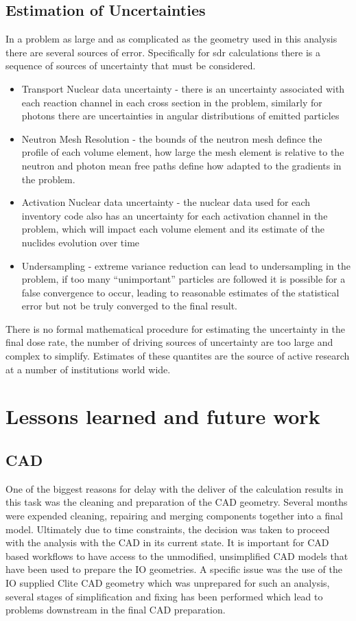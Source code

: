\documentclass[12pt]{article}
\begin{document}
\subsection{Estimation of Uncertainties}
In a problem as large and as complicated as the geometry used in this analysis
there are several sources of error. Specifically for \gls{sdr} calculations 
there is a sequence of sources of uncertainty that must be considered.
\begin{itemize} 
\item{Transport Nuclear data uncertainty - there is an uncertainty associated with each 
      reaction channel in each cross section in the problem, similarly for photons there are 
      uncertainties in angular distributions of emitted particles}
\item{Neutron Mesh Resolution - the bounds of the neutron mesh defince the 
      profile of each volume element, how large the mesh element is relative
      to the neutron and photon mean free paths define how adapted to the 
      gradients in the problem.}
\item{Activation Nuclear data uncertainty - the nuclear data used for each inventory code
     also has an uncertainty for each activation channel in the problem, which will 
     impact each volume element and its estimate of the nuclides evolution over time }
\item{Undersampling - extreme variance reduction can lead to undersampling in the problem,
     if too many ``unimportant'' particles are followed it is possible for a false 
     convergence to occur, leading to reasonable estimates of the statistical error but
     not be truly converged to the final result. }
\end{itemize}
There is no formal mathematical procedure for estimating the uncertainty in the final
dose rate, the number of driving sources of uncertainty are too large and complex to 
simplify. Estimates of these quantites are the source of active research at a number
of institutions world wide.

\newpage
\clearpage
\section{Lessons learned and future work}
\subsection*{CAD}
One of the biggest reasons for delay with the deliver of the calculation results
in this task was the cleaning and preparation of the CAD geometry. Several
months were expended cleaning, repairing and merging components together into a
final model. Ultimately due to time constraints, the decision was taken to
proceed with the analysis with the CAD in its current state. It is important
for CAD based workflows to have access to the unmodified, unsimplified CAD
models that have been used to prepare the IO geometries. A specific issue
was the use of the IO supplied Clite CAD geometry which was unprepared for
such an analysis, several stages of simplification and fixing has been performed
which lead to problems downstream in the final CAD preparation.
\end{document}
